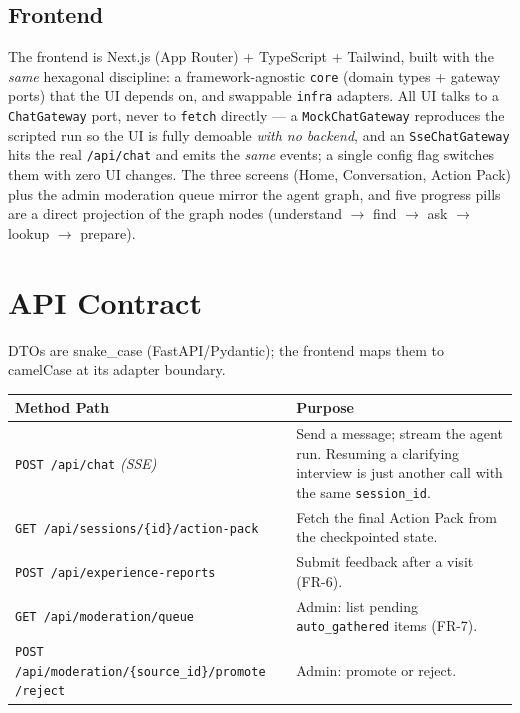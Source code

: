 \documentclass[11pt,a4paper]{article}
\begin{document}
\subsection{Frontend}
The frontend is Next.js (App Router) + TypeScript + Tailwind, built with the \emph{same} hexagonal
discipline: a framework-agnostic \texttt{core} (domain types + gateway ports) that the UI depends on,
and swappable \texttt{infra} adapters. All UI talks to a \texttt{ChatGateway} port, never to
\texttt{fetch} directly --- a \texttt{MockChatGateway} reproduces the scripted run so the UI is fully
demoable \emph{with no backend}, and an \texttt{SseChatGateway} hits the real \texttt{/api/chat} and
emits the \emph{same} events; a single config flag switches them with zero UI changes. The three
screens (Home, Conversation, Action Pack) plus the admin moderation queue mirror the agent graph, and
five progress pills are a direct projection of the graph nodes (understand $\to$ find $\to$ ask $\to$
lookup $\to$ prepare).

\section{API Contract}
\label{sec:api}

DTOs are snake\_case (FastAPI/Pydantic); the frontend maps them to camelCase at its adapter boundary.

\begin{center}
\begin{tabularx}{\linewidth}{@{}l Y@{}}
\toprule
\textbf{Method \textbullet{} Path} & \textbf{Purpose} \\
\midrule
\texttt{POST /api/chat} \emph{(SSE)} & Send a message; stream the agent run. Resuming a clarifying
interview is just another call with the same \texttt{session\_id}. \\
\texttt{GET /api/sessions/\{id\}/action-pack} & Fetch the final Action Pack from the checkpointed
state. \\
\texttt{POST /api/experience-reports} & Submit feedback after a visit (FR-6). \\
\texttt{GET /api/moderation/queue} & Admin: list pending \texttt{auto\_gathered} items (FR-7). \\
\texttt{POST /api/moderation/\{source\_id\}/promote} \textbar{} \texttt{/reject} & Admin: promote or
reject. \\
\bottomrule
\end{tabularx}
\end{center}
\end{document}

